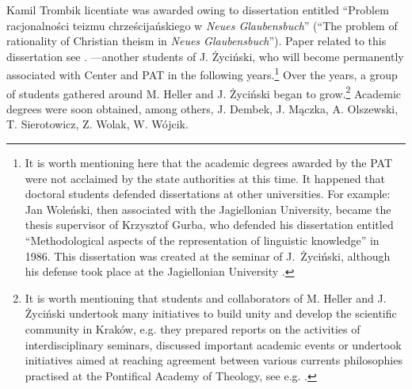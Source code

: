 \begin{artengenv}{Kamil Trombik}
{licentiate was awarded owing to dissertation entitled ``Problem racjonalności teizmu chrześcijańskiego w \textit{Neues
Glaubensbuch}'' (``The problem of rationality of Christian theism in \textit{Neues Glaubensbuch}''). Paper related to this
dissertation see
\parencite{dadaczynski_poznanie_1984}.
}---another students of J. Życiński, who will become
permanently associated with Center and PAT in the following years.\footnote{It is worth mentioning here that the
academic degrees awarded by the PAT were not acclaimed by the state authorities at this time. It happened that doctoral
students defended dissertations at other universities. For example: Jan Woleński, then associated with the Jagiellonian
University, became the thesis supervisor of Krzysztof Gurba, who defended his dissertation entitled ``Methodological aspects of
the representation of linguistic knowledge'' in 1986. This dissertation was created at the seminar of J.~Życiński,
although his defense took place at the Jagiellonian University
\parencite{wolenski_interview_2017}.
} Over the
years, a group of students gathered around M. Heller and J. Życiński began to grow.\footnote{It is worth mentioning
that students and collaborators of M. Heller and J. Życiński undertook many initiatives to build unity and develop the
scientific community in Kraków, e.g. they prepared reports on the activities of interdisciplinary seminars, discussed
important academic events or undertook initiatives aimed at reaching agreement between various currents philosophies
practised at the Pontifical Academy of Theology, see e.g.
\parencite{michalik_wstep_1984,glodz_miedzynarodowe_1987,samborski_intuicjonizm_1987,liana_w_1989,%
	dembek_matematycznosc_1990,wolak_interdyscyplinarnosc_1992,samborski_na_1992,wolak_neotomizm_1993}.
} Academic
degrees were soon obtained, among others, J. Dembek, J. Mączka, A. Olszewski, T. Sierotowicz, Z. Wolak, W. Wójcik.


\end{artengenv}

